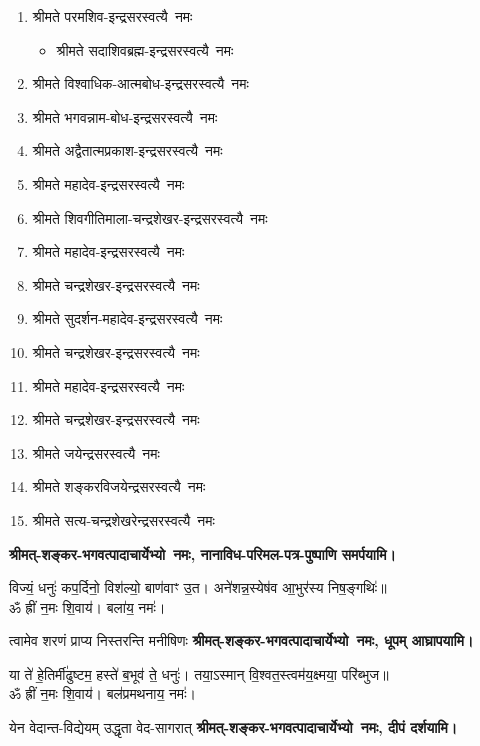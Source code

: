 \begin{center}
\begin{flushleft}
\begin{enumerate}
\item श्रीमते परमशिव-इन्द्रसरस्वत्यै~नमः
\begin{itemize}%
\item श्रीमते सदाशिवब्रह्म-इन्द्रसरस्वत्यै~नमः
\end{itemize}
\item श्रीमते विश्वाधिक-आत्मबोध-इन्द्रसरस्वत्यै~नमः
\item श्रीमते भगवन्नाम-बोध-इन्द्रसरस्वत्यै~नमः
\item श्रीमते अद्वैतात्मप्रकाश-इन्द्रसरस्वत्यै~नमः
\item श्रीमते महादेव-इन्द्रसरस्वत्यै~नमः
\item श्रीमते शिवगीतिमाला-चन्द्रशेखर-इन्द्रसरस्वत्यै~नमः
\item श्रीमते महादेव-इन्द्रसरस्वत्यै~नमः
\item श्रीमते चन्द्रशेखर-इन्द्रसरस्वत्यै~नमः
\item श्रीमते सुदर्शन-महादेव-इन्द्रसरस्वत्यै~नमः
\item श्रीमते चन्द्रशेखर-इन्द्रसरस्वत्यै~नमः
\item श्रीमते महादेव-इन्द्रसरस्वत्यै~नमः
\item श्रीमते चन्द्रशेखर-इन्द्रसरस्वत्यै~नमः
\item श्रीमते जयेन्द्रसरस्वत्यै~नमः
\item श्रीमते शङ्करविजयेन्द्रसरस्वत्यै~नमः
\item श्रीमते सत्य-चन्द्रशेखरेन्द्रसरस्वत्यै~नमः
\end{enumerate}

\end{flushleft}

\textbf{श्रीमत्-शङ्कर-भगवत्पादाचार्येभ्यो~नमः, नानाविध-परिमल-पत्र-पुष्पाणि समर्पयामि।}
\medskip

विज्यं॒ धनुः॑ कप॒र्दिनो॒ विश॑ल्यो॒ बाण॑वाꣳ उ॒त। अने॑शन्न॒\-स्येष॑व आ॒भुर॑स्य निष॒ङ्गथिः॑॥\\
ॐ ह्रीं न॒मः शि॒वाय॑। बला॑य॒ नमः॑।

{त्वामेव शरणं प्राप्य निस्तरन्ति मनीषिणः}
\textbf{श्रीमत्-शङ्कर-भगवत्पादाचार्येभ्यो~नमः, धूपम् आघ्रापयामि।}
\medskip

या ते॑ हे॒तिर्मी॑ढुष्टम॒ हस्ते॑ ब॒भूव॑ ते॒ धनुः॑। तया॒ऽस्मान् वि॒श्वत॒स्त्वम॑य॒क्ष्मया॒ परि॑ब्भुज॥\\
ॐ ह्रीं न॒मः शि॒वाय॑। बल॑प्रमथनाय॒ नमः॑।

{येन वेदान्त-विद्येयम् उद्धृता वेद-सागरात्}
\textbf{श्रीमत्-शङ्कर-भगवत्पादाचार्येभ्यो~नमः, दीपं दर्शयामि।}
\medskip


\end{center}
